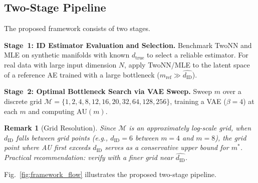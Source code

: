 \documentclass[lettersize,journal]{IEEEtran}
\newcommand{\dID}{d_{\mathrm{ID}}}
\newcommand{\dtrue}{d_{\mathrm{true}}}
\newtheorem{remark}{Remark}
\begin{document}
\subsection{Two-Stage Pipeline}

The proposed framework consists of two stages.

\textbf{Stage~1: ID Estimator Evaluation and Selection.}
Benchmark TwoNN and MLE on synthetic manifolds with known $\dtrue$ to select a reliable estimator.
For real data with large input dimension $N$, apply TwoNN/MLE to the latent space of a reference AE trained with a large bottleneck ($m_\mathrm{ref} \gg \hat{\dID}$).

\textbf{Stage~2: Optimal Bottleneck Search via VAE Sweep.}
Sweep $m$ over a discrete grid
$\mathcal{M} = \{1, 2, 4, 8, 12, 16, 20, 32, 64, 128, 256\}$,
training a VAE ($\beta=4$) at each $m$ and computing $\mathrm{AU}(m)$.

\begin{remark}[Grid Resolution]\label{rem:grid_resolution}
Since $\mathcal{M}$ is an approximately log-scale grid, when $\dID$ falls between grid points (e.g., $\dID = 6$ between $m=4$ and $m=8$), the grid point where AU first exceeds $\dID$ serves as a conservative upper bound for $m^*$.
Practical recommendation: verify with a finer grid near $\hat{\dID}$.
\end{remark}

Fig.~\ref{fig:framework_flow} illustrates the proposed two-stage pipeline.
\end{document}
